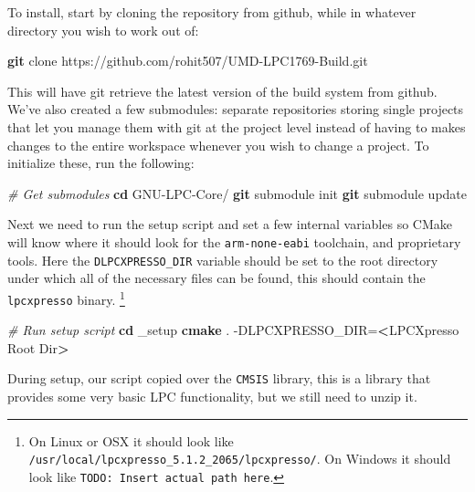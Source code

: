 \documentclass[]{article}
\newenvironment{Shaded}{\begin{snugshade}}{\end{snugshade}}
\newcommand{\KeywordTok}[1]{\textcolor[rgb]{0.13,0.29,0.53}{\textbf{{#1}}}}
\newcommand{\CommentTok}[1]{\textcolor[rgb]{0.56,0.35,0.01}{\textit{{#1}}}}
\newcommand{\NormalTok}[1]{{#1}}
\begin{document}
To install, start by cloning the repository from github, while in
whatever directory you wish to work out of:

\begin{Shaded}
\begin{Highlighting}[]
    \KeywordTok{git} \NormalTok{clone https://github.com/rohit507/UMD-LPC1769-Build.git}
\end{Highlighting}
\end{Shaded}

This will have git retrieve the latest version of the build system from
github. We've also created a few submodules: separate repositories
storing single projects that let you manage them with git at the project
level instead of having to makes changes to the entire workspace
whenever you wish to change a project. To initialize these, run the
following:

\begin{Shaded}
\begin{Highlighting}[]
    \CommentTok{# Get submodules}
    \KeywordTok{cd} \NormalTok{GNU-LPC-Core/}
    \KeywordTok{git} \NormalTok{submodule init}
    \KeywordTok{git} \NormalTok{submodule update}
\end{Highlighting}
\end{Shaded}

Next we need to run the setup script and set a few internal variables so
CMake will know where it should look for the \texttt{arm-none-eabi}
toolchain, and proprietary tools. Here the \texttt{DLPCXPRESSO\_DIR}
variable should be set to the root directory under which all of the
necessary files can be found, this should contain the
\texttt{lpcxpresso}
binary. \footnote{On
  Linux or OSX it should look like
  \texttt{/usr/local/lpcxpresso\_5.1.2\_2065/lpcxpresso/}. On Windows it
  should look like \texttt{TODO: Insert actual path here}.}

\begin{Shaded}
\begin{Highlighting}[]
    \CommentTok{# Run setup script}
    \KeywordTok{cd} \NormalTok{_setup}
    \KeywordTok{cmake} \NormalTok{. -DLPCXPRESSO_DIR=}\KeywordTok{<}\NormalTok{LPCXpresso Root Dir}\KeywordTok{>}
\end{Highlighting}
\end{Shaded}

During setup, our script copied over the \texttt{CMSIS} library, this is
a library that provides some very basic LPC functionality, but we still
need to unzip it.
\end{document}
